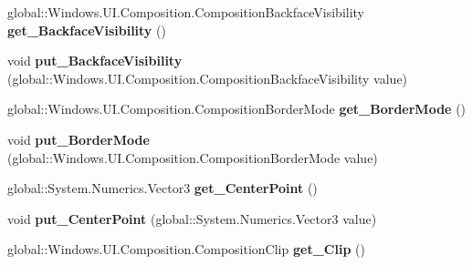 \begin{DoxyCompactItemize}
\item 
\mbox{\label{interface_windows_1_1_u_i_1_1_composition_1_1_i_visual_a83e38e1d6e7fc6654c6e612d6e9314dd}} 
global\+::\+Windows.\+U\+I.\+Composition.\+Composition\+Backface\+Visibility {\bfseries get\+\_\+\+Backface\+Visibility} ()
\item 
\mbox{\label{interface_windows_1_1_u_i_1_1_composition_1_1_i_visual_a22c2fbf95af53308d61ed61707e52a15}} 
void {\bfseries put\+\_\+\+Backface\+Visibility} (global\+::\+Windows.\+U\+I.\+Composition.\+Composition\+Backface\+Visibility value)
\item 
\mbox{\label{interface_windows_1_1_u_i_1_1_composition_1_1_i_visual_ad857db42be0a85e8710144f9a8a0b412}} 
global\+::\+Windows.\+U\+I.\+Composition.\+Composition\+Border\+Mode {\bfseries get\+\_\+\+Border\+Mode} ()
\item 
\mbox{\label{interface_windows_1_1_u_i_1_1_composition_1_1_i_visual_a81dd6285766651fb4d55a78808dbfbdf}} 
void {\bfseries put\+\_\+\+Border\+Mode} (global\+::\+Windows.\+U\+I.\+Composition.\+Composition\+Border\+Mode value)
\item 
\mbox{\label{interface_windows_1_1_u_i_1_1_composition_1_1_i_visual_a155a09b37b8789970281666bc3111f3d}} 
global\+::\+System.\+Numerics.\+Vector3 {\bfseries get\+\_\+\+Center\+Point} ()
\item 
\mbox{\label{interface_windows_1_1_u_i_1_1_composition_1_1_i_visual_ac736f9c5171d694ea168970125dee881}} 
void {\bfseries put\+\_\+\+Center\+Point} (global\+::\+System.\+Numerics.\+Vector3 value)
\item 
\mbox{\label{interface_windows_1_1_u_i_1_1_composition_1_1_i_visual_ad0c2e9949756caf002a9224770412cd2}} 
global\+::\+Windows.\+U\+I.\+Composition.\+Composition\+Clip {\bfseries get\+\_\+\+Clip} ()
\item 
\mbox{\label{interface_windows_1_1_u_i_1_1_composition_1_1_i_visual_aa89c3bfb77967afd71d66e1adb50d78a}} 

\end{DoxyCompactItemize}
